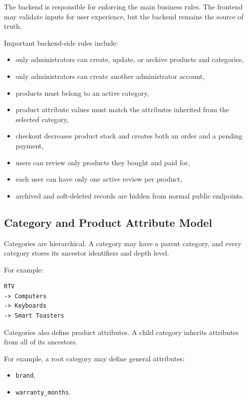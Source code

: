 The backend is responsible for enforcing the main business rules. The frontend may validate inputs for user experience, but the backend remains the source of truth.

Important backend-side rules include:

\begin{itemize}
    \item only administrators can create, update, or archive products and categories,
    \item only administrators can create another administrator account,
    \item products must belong to an active category,
    \item product attribute values must match the attributes inherited from the selected category,
    \item checkout decreases product stock and creates both an order and a pending payment,
    \item users can review only products they bought and paid for,
    \item each user can have only one active review per product,
    \item archived and soft-deleted records are hidden from normal public endpoints.
\end{itemize}

\subsection{Category and Product Attribute Model}

Categories are hierarchical. A category may have a parent category, and every category stores its ancestor identifiers and depth level.

For example:

\begin{verbatim}
RTV
-> Computers
-> Keyboards
-> Smart Toasters
\end{verbatim}

Categories also define product attributes. A child category inherits attributes from all of its ancestors.

For example, a root category may define general attributes:

\begin{itemize}
    \item \texttt{brand},
    \item \texttt{warranty\_months}.
\end{itemize}

